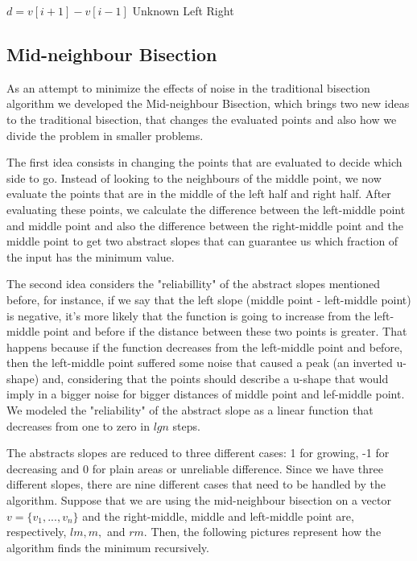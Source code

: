 \documentclass[12pt]{article}
\begin{document}
\begin{algorithm}[h]
\caption{}
\begin{algorithmic}[1]
    \State $d = v[i + 1] - v[i - 1]$
        \State
        \Return Unknown
        \State
        \Return Left
    \Else
        \State
        \Return Right
    \EndIf
\EndProcedure
\end{algorithmic}
\end{algorithm}

\subsection {Mid-neighbour Bisection}
As an attempt to minimize the effects of noise in the traditional bisection algorithm we developed the Mid-neighbour Bisection, which brings two new ideas to the traditional bisection, that changes the evaluated points and also how we divide the problem in smaller problems.

The first idea consists in changing the points that are evaluated to decide which side to go. Instead of looking to the neighbours of the middle point, we now evaluate the points that are in the middle of the left half and right half. After evaluating these points, we calculate the difference between the left-middle point and middle point and also the difference between the right-middle point and the middle point to get two abstract slopes that can guarantee us which fraction of the input has the minimum value. 

The second idea considers the "reliabillity" of the abstract slopes mentioned before, for instance, if we say that the left slope (middle point - left-middle point) is negative, it's more likely that the function is going to increase from the left-middle point and before if the distance between these two points is greater. That happens because if the function decreases from the left-middle point and before, then the left-middle point suffered some noise that caused a peak (an inverted u-shape) and, considering that the points should describe a u-shape that would imply in a bigger noise for bigger distances of middle point and lef-middle point. We modeled the "reliability" of the abstract slope as a linear function that decreases from one to zero in $lg n$ steps.

The abstracts slopes are reduced to three different cases: 1 for growing, -1 for decreasing and 0 for plain areas or unreliable difference. Since we have three different slopes, there are nine different cases that need to be handled by the algorithm. Suppose that we are using the mid-neighbour bisection on a vector $v = \{v_1, ..., v_n\}$ and the right-middle, middle and left-middle point are, respectively, $lm, m, $ and $rm$. Then, the following pictures represent how the algorithm finds the minimum recursively.
\end{document}
